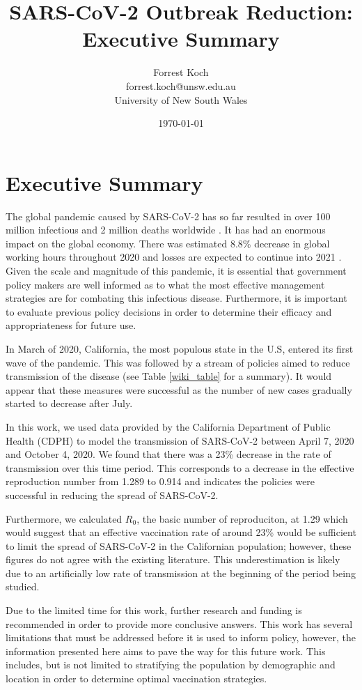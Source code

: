 \documentclass[11pt]{article}
\title{SARS-CoV-2 Outbreak Reduction: Executive Summary}
\author{
        Forrest Koch \\
        forrest.koch@unsw.edu.au \\
        University of New South Wales \\
}
\date{\today}
\begin{document}
\maketitle

\section{Executive Summary}
The global pandemic caused by SARS-CoV-2 has so far resulted in over 100 million infectious and 2 million deaths worldwide 
\cite{noauthor_who_nodate}.  It has had an enormous impact on the global economy. There was estimated 8.8\% decrease in 
global working hours throughout 2020 and losses are expected to continue into 2021 \cite{noauthor_ilo_2021}.  Given
the scale and magnitude of this pandemic, it is essential that government policy makers are well informed as to
what the most effective management strategies are for combating this infectious disease.  Furthermore, it is important
to evaluate previous policy decisions in order to determine their efficacy and appropriateness for future use.

In March of 2020, California, the most populous state in the U.S, entered its first wave of the pandemic.  This
was followed by a stream of policies aimed to reduce transmission of the disease (see Table \ref{wiki_table} for a summary).
It would appear that these measures were successful as the number of new cases gradually started to decrease after July.

In this work, we used data provided by the California Department of Public Health (CDPH) to model the transmission of 
SARS-CoV-2 between April 7, 2020 and October 4, 2020. We found that there was a 23\% decrease in the rate of transmission 
over this time period. This corresponds to a decrease in the effective reproduction number from 1.289 to 0.914 and indicates
the policies were successful in reducing the spread of SARS-CoV-2.

Furthermore, we calculated
$R_0$, the basic number of reproduciton,  at 1.29 which would suggest that an effective vaccination rate of around 23\% would be sufficient to limit the spread of
SARS-CoV-2 in the Californian population; however, these figures do not agree with the existing literature.  This underestimation is likely due to an
artificially low rate of transmission at the beginning of the period being studied.

Due to the limited time for this work, further research and funding is recommended in order to provide 
more conclusive answers.  This work has several limitations
that must be addressed before it is used to inform policy, however, the information presented here aims to pave the way for
this future work.  This includes, but is not limited to stratifying the population by demographic and location in order to
determine optimal vaccination strategies. 
\end{document}
